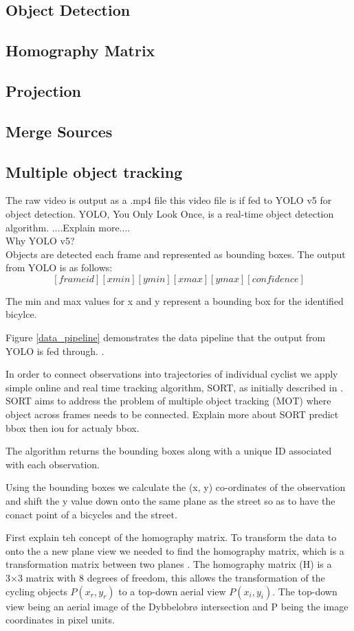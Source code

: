 \documentclass[
10pt, %
a4paper, %
oneside, %
headinclude,footinclude, %
] {book}%
\begin{document}
\subsection{Object Detection}
\subsection{Homography Matrix}
\subsection{Projection}
\subsection{Merge Sources}
\subsection{Multiple object tracking}


The raw video is output as a .mp4 file this video file is if fed to YOLO v5 for object detection. YOLO, You Only Look Once,
is a real-time object detection algorithm. ....Explain more.... 
\ \\ 
Why YOLO v5?
\ \\ 
Objects are detected each frame and represented as bounding boxes.
The output from YOLO is as follows: \[ [frame id][xmin][ymin][xmax][ymax][confidence]  \]

The min and max values for x and y represent a bounding box for the identified bicylce.

Figure \ref{data_pipeline} demonstrates the data pipeline that the output from YOLO is fed through. .

In order to connect observations into trajectories of individual cyclist we apply 
simple online and real time tracking algorithm, SORT, as initially described in \cite{Bewley2016_sort}. 
SORT aims to address the problem of multiple object tracking (MOT) where object across frames needs to be connected. 
Explain more about SORT predict bbox then iou for actualy bbox.

The algorithm returns the bounding boxes along with a unique ID associated with each observation.

Using the bounding boxes we calculate the (x, y) co-ordinates of the observation and shift the y value down onto 
the same plane as the street so as to have the conact point of a bicycles and the street.

First explain teh concept of the homography matrix.
To transform the data to onto the a new plane view we needed to find the homography matrix, which is a transformation matrix between two planes \cite{hartley_zisserman_2004}.
The homography matrix (H) is a 3×3 matrix with 8 degrees of freedom, this allows the transformation of the cycling objects $P(x_r, y_r)$ to a 
top-down aerial view $P(x_i, y_i)$. The top-down view being an aerial image of the Dybbelobrø intersection and P being the image coordinates in pixel units.
\end{document}
